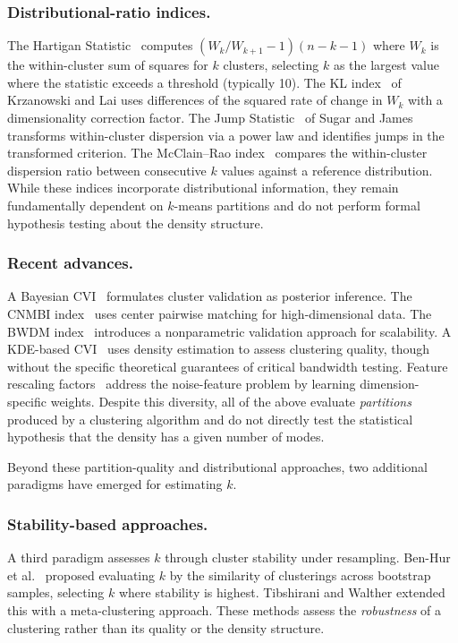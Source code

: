 \documentclass[journal]{IEEEtran}
\begin{document}
\subsubsection*{Distributional-ratio indices.}
The Hartigan Statistic~\cite{hartigan1975clustering} computes $(W_k / W_{k+1} - 1)(n - k - 1)$ where $W_k$ is the within-cluster sum of squares for $k$ clusters, selecting $k$ as the largest value where the statistic exceeds a threshold (typically 10). The KL index~\cite{krzanowski1988criterion} of Krzanowski and Lai uses differences of the squared rate of change in $W_k$ with a dimensionality correction factor. The Jump Statistic~\cite{sugar2003finding} of Sugar and James transforms within-cluster dispersion via a power law and identifies jumps in the transformed criterion. The McClain--Rao index~\cite{mcclain1990clustplot} compares the within-cluster dispersion ratio between consecutive $k$ values against a reference distribution. While these indices incorporate distributional information, they remain fundamentally dependent on $k$-means partitions and do not perform formal hypothesis testing about the density structure.

\subsubsection*{Recent advances.}
A Bayesian CVI~\cite{wiroonsri2024bayesian} formulates cluster validation as posterior inference. The CNMBI index~\cite{zhang2026cnmbi} uses center pairwise matching for high-dimensional data. The BWDM index~\cite{baragilly2025high} introduces a nonparametric validation approach for scalability. A KDE-based CVI~\cite{modak2022new} uses density estimation to assess clustering quality, though without the specific theoretical guarantees of critical bandwidth testing. Feature rescaling factors~\cite{deamorim2016recovering} address the noise-feature problem by learning dimension-specific weights. Despite this diversity, all of the above evaluate \emph{partitions} produced by a clustering algorithm and do not directly test the statistical hypothesis that the density has a given number of modes.

Beyond these partition-quality and distributional approaches, two additional paradigms have emerged for estimating $k$.

\subsubsection*{Stability-based approaches.}
A third paradigm assesses $k$ through cluster stability under resampling. Ben-Hur et al.~\cite{benhur2002stability} proposed evaluating $k$ by the similarity of clusterings across bootstrap samples, selecting $k$ where stability is highest. Tibshirani and Walther extended this with a meta-clustering approach. These methods assess the \emph{robustness} of a clustering rather than its quality or the density structure.
\end{document}
